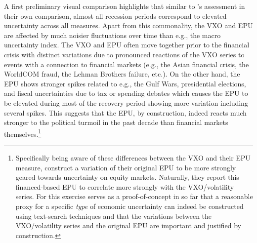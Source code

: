 \documentclass[a4paper,11pt,listof=nochaptergap,oneside,pointednumbers,bibtotoc,bigheadings,liststotoc,hidelinks]{scrbook}
\theoremstyle{mysatz}
\theoremstyle{mydefinition}
\theoremstyle{mytheorem}
\theoremstyle{mybemerkung}
\begin{document}
A first preliminary visual comparison highlights that similar to \citet{bachmannetal:13}'s assessment in their own comparison, almost all recession periods correspond to elevated uncertainty across all measures. Apart from this commonality, the VXO and EPU are affected by much noisier fluctuations over time than e.g., the macro uncertainty index. The VXO and EPU often move together prior to the financial crisis with distinct variations due to pronounced reactions of the VXO series to events with a connection to financial markets (e.g., the Asian financial crisis, the WorldCOM fraud, the Lehman Brothers failure, etc.). On the other hand, the EPU shows stronger spikes related to e.g., the Gulf Wars, presidential elections, and fiscal uncertainties due to tax or spending debates which causes the EPU to be elevated during most of the recovery period showing more variation including several spikes. This suggests that the EPU, by construction, indeed reacts much stronger to the political turmoil in the past decade than financial markets themselves.\footnote{Specifically being aware of these differences between the VXO and their EPU measure, \citet{bakeretal:15} construct a variation of their original EPU to be more strongly geared towards uncertainty on equity markets. Naturally, they report this financed-based EPU to correlate more strongly with the VXO/volatility series. For \citet{bakeretal:15} this exercise serves as a proof-of-concept in so far that a reasonable proxy for a specific \textit{type} of economic uncertainty can indeed be constructed using text-search techniques and that the variations between the VXO/volatility series and the original EPU are important and justified by construction.} 
\end{document}
